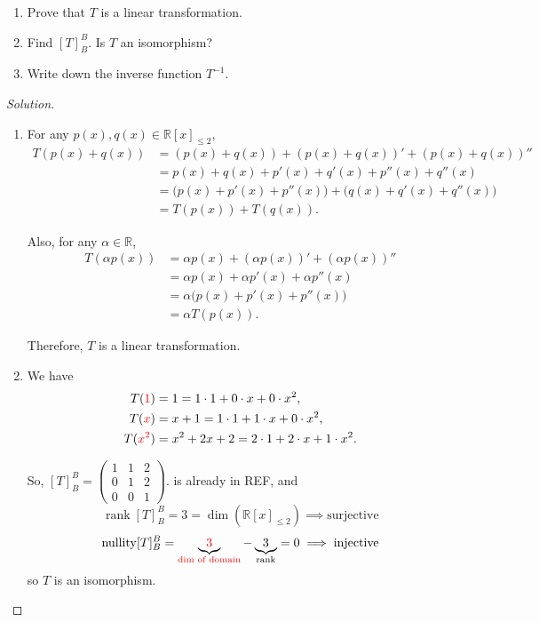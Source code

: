 \documentclass[12pt]{article}
\newenvironment{solution}
{\begin{proof}[Solution]}
{\end{proof}}
\begin{document}
\begin{enumerate}
    \item[(a)] Prove that $T$ is a linear transformation.
    \item[(b)] Find $[T]^B_B$. Is $T$ an isomorphism?
    \item[(c)] Write down the inverse function $T^{-1}$.
\end{enumerate}

\begin{solution}
\begin{enumerate}
\item[(a)]
For any $p(x),q(x)\in\mathbb{R}[x]_{\leq 2}$,
\begin{align*}
T(p(x)+q(x))
&=(p(x)+q(x))+(p(x)+q(x))'+(p(x)+q(x))''\\
&=p(x)+q(x)+p'(x)+q'(x)+p''(x)+q''(x)\\
&=\bigl(p(x)+p'(x)+p''(x)\bigr)
 +\bigl(q(x)+q'(x)+q''(x)\bigr)\\
&=T(p(x))+T(q(x)).
\end{align*}

Also, for any $\alpha\in\mathbb{R}$,
\begin{align*}
T(\alpha p(x))
&=\alpha p(x)+(\alpha p(x))'+(\alpha p(x))''\\
&=\alpha p(x)+\alpha p'(x)+\alpha p''(x)\\
&=\alpha\bigl(p(x)+p'(x)+p''(x)\bigr)\\
&=\alpha T(p(x)).
\end{align*}

Therefore, $T$ is a linear transformation.

\item[(b)]
We have
\begin{align*}
T(\textcolor{red}{1})
&=1
 =1\cdot1+0\cdot x+0\cdot x^2,\\
T(\textcolor{red}{x})
&=x+1
 =1\cdot1+1\cdot x+0\cdot x^2,\\
T(\textcolor{red}{x^2})
&=x^2+2x+2
 =2\cdot1+2\cdot x+1\cdot x^2.
\end{align*}

So,
$
[T]^B_B=
\begin{pmatrix}
1 & 1 & 2\\
0 & 1 & 2\\
0 & 0 & 1
\end{pmatrix}.
$ is already in REF, and
\[
\operatorname{rank}[T]^B_B=3=\dim(\mathbb{R}[x]_{\leq2}) \implies \text{surjective}
\]
\[
\operatorname{nullity}[T]^B_B=\underbrace{\textcolor{red}{3}}_{\textcolor{red}{\text{dim of domain}}}-\underbrace{3}_{\text{rank}}=0 \implies \text{injective}
\]
so $T$ is an isomorphism.


\end{enumerate}
\end{solution}
\end{document}
